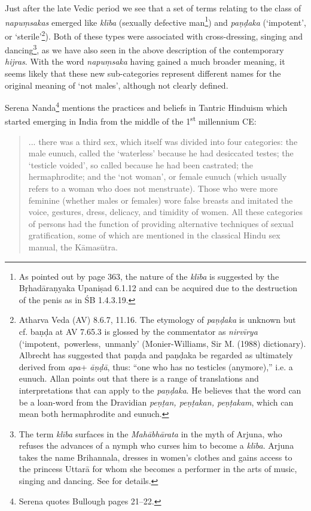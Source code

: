 Just after the late Vedic period we see that a set of terms relating to the class of {\em napuṃsakas} emerged like {\em klība} (sexually defective man\footnote{As pointed out by \cite{zwilling} page 363, the nature of the {\em klība} is suggested by the Bṛhadāraṇyaka Upaniṣad 6.1.12 and can be acquired due to the destruction of the penis as in ŚB 1.4.3.19.}) and {\em paṇḍaka} (`impotent', or `sterile'\footnote{Atharva Veda (AV) 8.6.7, 11.16. The etymology of {\em paṇḍaka} is unknown but cf. baṇḍa at AV 7.65.3 is glossed by the commentator as {\em nirvīrya} (`impotent, powerless, unmanly' (Monier-Williams, Sir M. (1988) dictionary). Albrecht \cite{wezler} has suggested that paṇḍa and paṇḍaka be regarded as ultimately derived from {\em *apa}+ {\em āṇḍā}, thus: “one who has no testicles (anymore),” i.e. a eunuch. Allan \cite{bomhard} points out that there is a range of translations and interpretations that can apply to the {\em paṇḍaka}. He believes that the word can be a loan-word from the Dravidian {\em peṇṭan, peṇṭakan, peṇṭakam}, which can mean both hermaphrodite and eunuch.}). Both of these types were associated with cross-dressing, singing and dancing\footnote{The term {\em klība} surfaces in the {\em Mahābhārata} in the myth of Arjuna, who refuses the advances of a nymph who curses him to become a {\em klība}. Arjuna takes the name Brihannala, dresses in women's clothes and gains access to the princess Uttarā for whom she becomes a performer in the arts of music, singing and dancing. See \cite{cassell} for details.}, as we have also seen in the above description of the contemporary {\em hijras}. With the word {\em napuṃsaka} having gained a much broader meaning, it seems likely that these new sub-categories represent different names for the original meaning of `not males', although not clearly defined.

Serena Nanda\footnote{Serena \cite{nanda} quotes Bullough pages 21–22.} mentions the practices and beliefs in Tantric Hinduism which started emerging in India from the middle of the 1\textsuperscript{st} millennium CE:

\begin{quote}
... there was a third sex, which itself was divided into four categories: the male eunuch, called the `waterless' because he had desiccated testes; the `testicle voided', so called because he had been castrated; the hermaphrodite; and the `not woman', or female eunuch (which usually refers to a woman who does not menstruate). Those who were more feminine (whether males or females) wore false breasts and imitated the voice, gestures, dress, delicacy, and timidity of women. All these categories of persons had the function of providing alternative techniques of sexual gratification, some of which are mentioned in the classical Hindu sex manual, the Kāmasūtra.
\end{quote}

